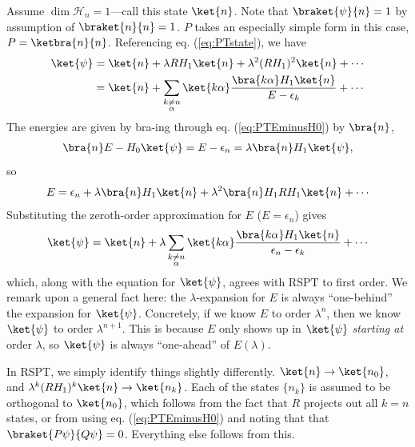 \documentclass[11pt]{article}
\begin{document}
\begin{eexample}
    Assume $\dim{\mathcal{H}_n} = 1$---call this state $\ket{n}$. Note that
    $\braket{\psi}{n} = 1$ by assumption of $\braket{n}{n} = 1$. $P$ takes an
    especially simple form in this case, $P = \ketbra{n}{n}$. Referencing eq. (\ref{eq:PTstate}),
    we have
    \begin{align*}
        \ket{\psi} & = \ket{n} + \lambda R H_1 \ket{n} + \lambda^2 (RH_1)^2 \ket{n} + \cdots\\
        & = \ket{n} + \sum_{\substack{k \neq n \\ \alpha}} \ket{k\alpha} \frac{\bra{k\alpha}H_1 \ket{n}}{E - \epsilon_k} + \cdots
    \end{align*}
    The energies are given by bra-ing through eq. (\ref{eq:PTEminusH0})
    by $\bra{n}$,
    \begin{align*}
        \bra{n}E - H_0 \ket{\psi} = E - \epsilon_n = \lambda \bra{n} H_1 \ket{\psi},
    \end{align*}
    so
    \begin{align*}
        E = \epsilon_n + \lambda \bra{n} H_1 \ket{n} + \lambda^2 \bra{n} H_1 R H_1 \ket{n} + \cdots
    \end{align*}
    Substituting the zeroth-order approximation for $E$ ($E = \epsilon_n$) gives
    \begin{align*}
        \ket{\psi} = \ket{n} + \lambda \sum_{\substack{k \neq n \\ \alpha}} \ket{k\alpha} \frac{\bra{k\alpha}H_1 \ket{n}}{\epsilon_n - \epsilon_k} + \cdots
    \end{align*}
    which, along with the equation for $\ket{\psi}$, agrees with RSPT to first order.
    We remark upon a general fact here: the $\lambda$-expansion for $E$ is always ``one-behind''
    the expansion for $\ket{\psi}$. Concretely, if we know $E$ to order $\lambda^n$,
    then we know $\ket{\psi}$ to order $\lambda^{n + 1}$. This is because $E$ only shows
    up in $\ket{\psi}$ \emph{starting at} order $\lambda$, so $\ket{\psi}$ is always
    ``one-ahead'' of $E(\lambda)$. 

    In RSPT, we simply identify things slightly differently.
    $\ket{n} \to \ket{n_0}$, and $\lambda^k (RH_1)^k \ket{n} \to \ket{n_k}$.
    Each of the states $\{ n_k \}$ is assumed to be orthogonal to $\ket{n_0}$,
    which follows from the fact that $R$ projects out all $k = n$ states,
    or from using eq. (\ref{eq:PTEminusH0}) and noting that that $\braket{P\psi}{Q\psi} = 0$.
    Everything else follows from this.
\end{eexample}
\end{document}
